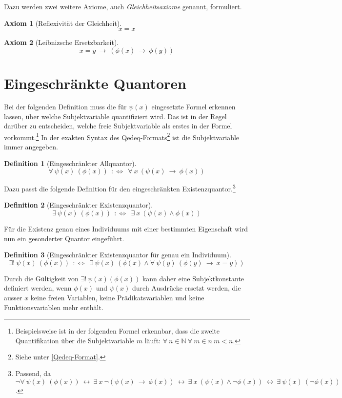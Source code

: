 \documentclass[a4paper,german,10pt,twoside]{book}
\newtheorem{ax}{Axiom}
\newtheorem{defn}{Definition}
\newcommand{\defp}{\ :\Leftrightarrow \ }
\newcommand{\impl}{\ \rightarrow \ }
\newcommand{\equi}{\ \leftrightarrow \ }
\newcommand{\N}{\mathbb{N}}
\begin{document}
{Dazu werden zwei weitere Axiome, auch
\emph{Gleichheitsaxiome} genannt, formuliert.
\begin{ax}[Reflexivit{\"a}t der Gleichheit]
$$x = x$$
\end{ax}

\begin{ax}[Leibnizsche Ersetzbarkeit]\label{leibniz}
$$x = y	 \impl (\phi(x) \impl \phi(y))$$
\end{ax}

\section{Eingeschr{\"a}nkte Quantoren}
Bei der folgenden Definition muss die f{\"u}r $\psi(x)$ eingesetzte Formel {\glqq erkennen
lassen\grqq}, {\"u}ber welche Subjektvariable quantifiziert wird. Das ist in der Regel dar{\"u}ber zu
entscheiden, welche freie Subjektvariable als erstes in der Formel
vorkommt.\footnote{Beispielsweise ist in der folgenden Formel erkennbar, dass die zweite
Quantifikation {\"u}ber die Subjektvariable $m$ l{\"a}uft: $\forall \ n \in \N \ \forall \ m \in n \ m < n
$.} In der exakten Syntax des Qedeq-Formats\footnote{Siehe unter \ref{Qedeq-Format}.} ist die
Subjektvariable immer angegeben.
\begin{defn}[Eingeschr{\"a}nkter Allquantor]
$$ \forall \ \psi(x) \ (\phi(x)) \ \defp \ \forall \ x \ (\psi(x) \impl \phi(x))$$
\end{defn}

Dazu passt die folgende Definition f{\"u}r den eingeschr{\"a}nkten Existenzquantor.\footnote{Passend, da
$\neg \forall \ \psi(x) \ (\phi(x)) \equi \exists \ x \ \neg (\psi(x) \impl \phi(x)) \equi \exists
\ x \ (\psi(x) \land \neg\phi(x)) \equi \exists \ \psi(x) \ (\neg\phi(x))$.}
\begin{defn}[Eingeschr{\"a}nkter Existenzquantor]
$$ \exists \ \psi(x) \ (\phi(x)) \ \defp \ \exists \ x \ (\psi(x) \land \phi(x))$$
\end{defn}

F{\"u}r die Existenz genau eines Individuums mit einer bestimmten Eigenschaft wird nun ein gesonderter
Quantor eingef{\"u}hrt.
\begin{defn}[Eingeschr{\"a}nkter Existenzquantor f{\"u}r genau ein Individuum]
$$ \exists! \ \psi(x) \ (\phi(x)) \ \defp \ \exists \ \psi(x) \ (\phi(x) \land \forall \ \psi(y) \ (\phi(y) \impl x = y))$$
\end{defn}
Durch die G{\"u}ltigkeit von $\exists! \ \psi(x) (\phi(x))$ kann daher eine Subjektkonstante definiert
werden, wenn $\phi(x)$ und $\psi(x)$ durch Ausdr{\"u}cke ersetzt werden, die ausser $x$ keine freien
Variablen, keine Pr{\"a}dikatsvariablen und keine Funktionsvariablen mehr enth{\"a}lt.

}
\end{document}
